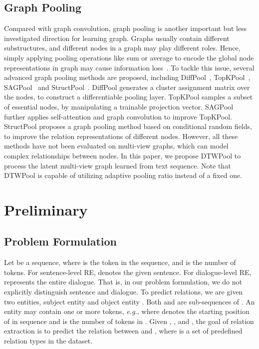 \documentclass[letterpaper]{article} \usepackage{aaai21}  \usepackage{times}  \usepackage{helvet} \usepackage{courier}  \usepackage[hyphens]{url}  \usepackage{graphicx} \urlstyle{rm} \def\UrlFont{\rm}  \usepackage{graphicx}  \usepackage{natbib}  \usepackage{caption}
\newcommand{\eg}{\emph{e.g.,}\xspace}
\begin{document}
\subsection{Graph Pooling}
Compared with graph convolution, graph pooling is another important but less investigated direction for learning graph. Graphs usually contain different substructures, and different nodes in a graph may play different roles. Hence, simply applying pooling operations like sum or average to encode the global node representations in graph may cause information loss~\cite{atwood2016diffusion,simonovsky2017dynamic}. To tackle this issue, several advanced graph pooling methods are proposed, including DiffPool~\cite{ying2018hierarchical}, TopKPool~\cite{gao2019graph}, SAGPool~\cite{pmlr-v97-lee19c} and StructPool~\cite{yuan2019structpool}. DiffPool generates a cluster assignment matrix over the nodes, to construct a differentiable pooling layer. TopKPool samples a subset of essential nodes, by manipulating a trainable projection vector. SAGPool further applies self-attention and graph convolution to improve TopKPool. StructPool proposes a graph pooling method based on conditional random fields, to improve the relation representations of different nodes. However, all these methods have not been evaluated on multi-view graphs, which can model complex relationships between nodes. In this paper, we propose DTWPool to process the latent multi-view graph learned from text sequence. Note that DTWPool is capable of utilizing adaptive pooling ratio instead of a fixed one.


\section{Preliminary}
\label{sec:prelim}


\subsection{Problem Formulation}
Let  be a sequence, where  is the  token in the sequence, and  is the number of tokens. For sentence-level RE,  denotes the given sentence. For dialogue-level RE,  represents the entire dialogue. That is, in our problem formulation, we do not explicitly distinguish sentence and dialogue. To predict relations, we are given two entities, subject entity  and object entity . Both  and  are sub-sequences of . An entity may contain one or more tokens, \eg   where  denotes the starting position of  in sequence  and  is the number of tokens in .  Given , , and , the goal of relation extraction is to predict the relation  between  and , where  is a set of predefined relation types in the dataset. 
\end{document}
